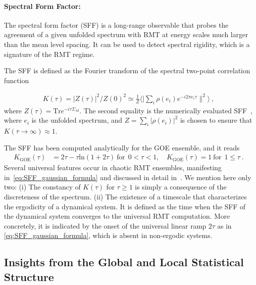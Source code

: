 \documentclass{article}
\DeclareMathOperator{\tr}{tr}
\def\tr{\textrm{Tr}}
\begin{document}
\paragraph{Spectral Form Factor:}
The spectral form factor (SFF) is a long-range observable that probes the agreement of a given unfolded spectrum with RMT at energy scales much larger than the mean level spacing. It can be used to detect spectral rigidity, which is a signature of the RMT regime.

The SFF is defined as the Fourier transform of the spectral two-point correlation function~\citep{Shenker_et_al_SFF_first,Liu_2018}

\begin{align}
    \label{eq:SFF_def}
    K(\tau) = {|Z(\tau)|^2}/{Z(0)^2}
    \simeq
    \frac{1}{Z}
    \big\langle
    |{\sum_{i} \rho(e_i) e^{- i 2 \pi e_i \tau}}
    \|^2 
    \big
    \rangle 
    \ ,
\end{align}
where $Z(\tau) = \tr e^{- i \tau \Sigma_M}$. 
The second equality is the numerically evaluated SFF~\citep{vidmar_1905.06345}, where $e_i$ is the unfolded spectrum, and $Z =  \sum_i |{\rho(e_i)}|^2$ is chosen to ensure that $K(\tau\to\infty) \approx 1$.

The SFF has been computed analytically for the GOE ensemble, and it reads
\begin{align}
\label{eq:SFF_gaussian_formula}
K_{\mathrm{GOE}}(\tau) &= 2\tau - \tau  \mathrm{ln}(1 + 2\tau) \
\text{for}~~0 < \tau < 1, \quad
K_{\mathrm{GOE}}(\tau) = 1 
\
\text{for}~~ 1 \leq \tau 
\ .
\end{align}
Several universal features occur in chaotic RMT ensembles, manifesting in~\cref{eq:SFF_gaussian_formula} and discussed in detail in~\citet{Liu_2018,Kim_2023}. We mention here only two: (i) The
constancy of $K(\tau)$ for $\tau \geq 1$ is simply a consequence of the discreteness of the spectrum.
(ii) The existence of a timescale that characterizes the ergodicity of a dynamical system. It is defined as the time when the SFF of the dynamical system converges to the universal RMT computation. More concretely, it is indicated by the onset of the universal linear ramp $2\tau$ as in \eqref{eq:SFF_gaussian_formula},
which is absent in non-ergodic systems. 

\subsection{Insights from the Global and Local Statistical Structure}
\end{document}
